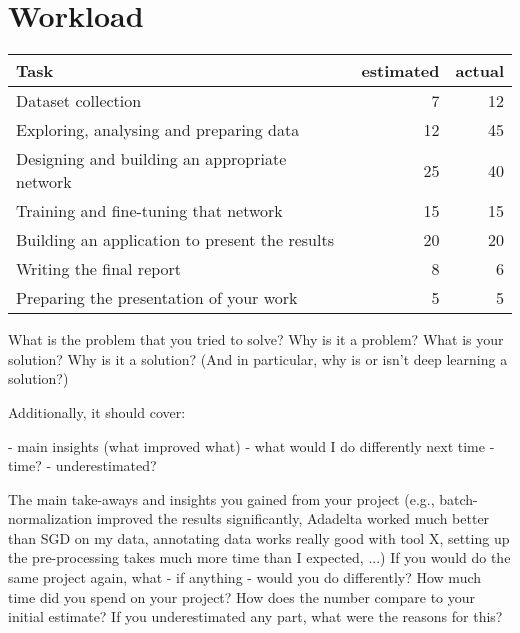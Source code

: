 \documentclass[a4paper, 10pt, xcolor=dvipsnames]{article} %
\begin{document}
\section*{Workload}
\begin{tabular}{lrr}
  Task                                           & estimated & actual \\
  \hline
  \hline
  Dataset collection                             & 7         & 12     \\
  Exploring, analysing and preparing data        & 12        & 45     \\
  Designing and building an appropriate network  & 25        & 40     \\
  Training and fine-tuning that network          & 15        & 15     \\
  Building an application to present the results & 20        & 20     \\
  Writing the final report                       & 8         & 6      \\
  Preparing the presentation of your work        & 5         & 5
\end{tabular}

\pagebreak
What is the problem that you tried to solve?
Why is it a problem?
What is your solution?
Why is it a solution? (And in particular, why is or isn’t deep learning a solution?)

Additionally, it should cover:

- main insights (what improved what)
- what would I do differently next time
- time?
- underestimated?

The main take-aways and insights you gained from your project (e.g.,
batch-normalization improved the results significantly, Adadelta worked much
better than SGD on my data, annotating data works really good with tool X,
setting up the pre-processing takes much more time than I expected, ...) If you
would do the same project again, what - if anything - would you do differently?
How much time did you spend on your project? How does the number compare to
your initial estimate? If you underestimated any part, what were the reasons
for this?

\printbibliography
\end{document}
